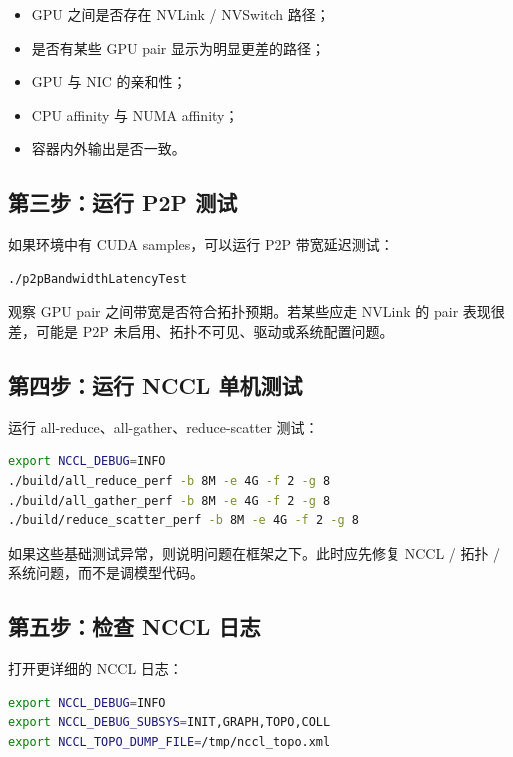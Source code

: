\begin{itemize}
  \item GPU 之间是否存在 NVLink / NVSwitch 路径；
  \item 是否有某些 GPU pair 显示为明显更差的路径；
  \item GPU 与 NIC 的亲和性；
  \item CPU affinity 与 NUMA affinity；
  \item 容器内外输出是否一致。
\end{itemize}

\subsection{第三步：运行 P2P 测试}
\label{subsec:debug-step-p2p}

如果环境中有 CUDA samples，可以运行 P2P 带宽延迟测试：

\begin{lstlisting}[language=bash,caption={运行 P2P bandwidth/latency 测试},label={lst:debug-p2p}]
./p2pBandwidthLatencyTest
\end{lstlisting}

观察 GPU pair 之间带宽是否符合拓扑预期。若某些应走 NVLink 的 pair 表现很差，可能是 P2P 未启用、拓扑不可见、驱动或系统配置问题。

\subsection{第四步：运行 NCCL 单机测试}
\label{subsec:debug-step-nccl-single}

运行 all-reduce、all-gather、reduce-scatter 测试：

\begin{lstlisting}[language=bash,caption={单机 NCCL collective 测试},label={lst:debug-nccl-single}]
export NCCL_DEBUG=INFO
./build/all_reduce_perf -b 8M -e 4G -f 2 -g 8
./build/all_gather_perf -b 8M -e 4G -f 2 -g 8
./build/reduce_scatter_perf -b 8M -e 4G -f 2 -g 8
\end{lstlisting}

如果这些基础测试异常，则说明问题在框架之下。此时应先修复 NCCL / 拓扑 / 系统问题，而不是调模型代码。

\subsection{第五步：检查 NCCL 日志}
\label{subsec:debug-step-nccl-log}

打开更详细的 NCCL 日志：

\begin{lstlisting}[language=bash,caption={NCCL 拓扑调试日志},label={lst:debug-nccl-log}]
export NCCL_DEBUG=INFO
export NCCL_DEBUG_SUBSYS=INIT,GRAPH,TOPO,COLL
export NCCL_TOPO_DUMP_FILE=/tmp/nccl_topo.xml
\end{lstlisting}

